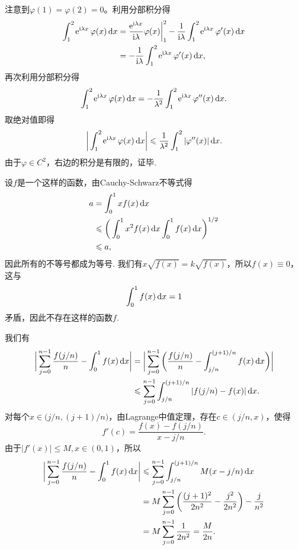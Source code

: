 \begin{ans}
  注意到$\varphi(1)=\varphi(2)=0$。利用分部积分得
  \begin{align*}
    \int_1^2\ee^{\ii\lambda x}\varphi(x)\,\mathrm dx
    & = \frac{\ee^{\ii\lambda x}}{\ii\lambda}\varphi(x)
    \bigg|_1^2-\frac1{\ii\lambda}\int_1^2\ee^{\ii\lambda x}
    \varphi'(x)\,\dx \\
    & = -\frac1{\ii\lambda}\int_1^2\ee^{\ii\lambda x}\varphi'(x)\,\dx,
  \end{align*}
  再次利用分部积分得
  \[ \int_1^2\operatorname{\!\!\;\mathrm e}^{\mathrm i\lambda x}\varphi(x)\,\mathrm dx =-
  \frac1{\lambda^2}\int_1^2\operatorname{\!\!\;\mathrm e}^{\mathrm i\lambda x}\varphi''(x)\,\mathrm dx. \]
  取绝对值即得
  \[ \bigg| \int_1^2\operatorname{\!\!\;\mathrm e}^{\mathrm i\lambda x}\varphi(x)\,\mathrm dx \bigg|
  \leqslant\frac 1{\lambda^2}\int_1^2|\varphi''(x)|\,\mathrm dx. \]
  由于$\varphi\in C^2$，右边的积分是有限的，证毕.
\end{ans}

\begin{ans}
  设$f$是一个这样的函数，由Cauchy-Schwarz不等式得
  \begin{align*}
    a & = \int_0^1xf(x)\,\mathrm dx\\
      & \leqslant \bigg( \int_0^1x^2f(x)\,\mathrm dx\int_0^1f(x)\,\mathrm dx \bigg)^{1/2}\\
      & \leqslant a,
  \end{align*}
  因此所有的不等号都成为等号. 我们有$x\sqrt{f(x)}=k\sqrt{f(x)}$，所以$f(x)\equiv0$，这与
  \[ \int_0^1f(x)\,\mathrm dx=1 \]
  矛盾，因此不存在这样的函数$f$.
\end{ans}

\begin{ans}
  我们有
  \begin{align*}
    \bigg| \sum_{j=0}^{n-1}\frac{f(j/n)}n -
    \int_0^1f(x)\,\mathrm dx \bigg|
    & = \bigg| \sum_{j=0}^{n-1}\bigg(
     \frac{f(j/n)}n- \int_{j/n}^{(j+1)/n} f(x)\,\mathrm dx
    \bigg) \bigg|\\
    & \leqslant \sum_{j=0}^{n-1}\int_{j/n}^{(j+1)/n}
    |f(j/n)-f(x)|\,\mathrm dx.
  \end{align*}
   对每个$x\in\big(j/n,(j+1)/n\big)$，由Lagrange中值定理，存在$c\in(j/n,x)$，使得
    \[ f'(c)=\frac{f(x)-f(j/n)}{x-j/n}. \]
   由于$|f'(x)|\le M,x\in(0,1)$，所以
   \begin{align*}
     \bigg| \sum_{j=0}^{n-1}\frac{f(j/n)}n -
    \int_0^1f(x)\,\mathrm dx \bigg|
    & \leqslant \sum_{j=0}^{n-1}\int_{j/n}^{(j+1)/n}M(x-j/n)\,\mathrm dx\\
    & = M\sum_{j=0}^{n-1}\bigg( \frac{(j+1)^2}{2n^2}
    -\frac {j^2}{2n^2} \bigg) -\frac j{n^2}\\
    & = M\sum_{j=0}^{n-1} \frac1{2n^2} = \frac M{2n}.
   \end{align*}
\end{ans}

